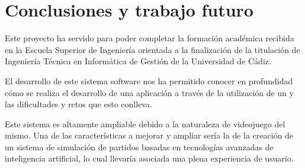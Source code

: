 \section{Conclusiones y trabajo futuro}
Este proyecto ha servido para poder completar la formación académica recibida en
la Escuela Superior de Ingeniería orientada a la finalización de la titulación
de Ingeniería Técnica en Informática de Gestión de la Universidad de Cádiz.

El desarrollo de este sistema software nos ha permitido conocer en profundidad
cómo se realiza el desarrollo de una aplicación a través de la utilización de un
 y las dificultades y retos que esto conlleva.

Este sistema es altamente ampliable debido a la naturaleza de videojuego del
mismo. Una de las características a mejorar y ampliar sería la de la creación de
un sistema de simulación de partidos basadas en tecnologías avanzadas de
inteligencia artificial, lo cual llevaría asociada una plena experiencia de usuario.